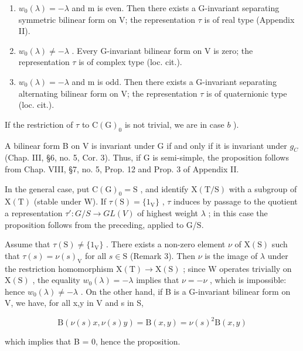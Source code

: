 \begin{enumerate}
\def\labelenumi{\alph{enumi})}
\item
  \(w_{0}(\lambda) = -\lambda\) and m is even. Then there exists a G-invariant separating symmetric bilinear form on V; the representation \(\tau\) is of real type (Appendix II).
\item
  \(w_{0}(\lambda) \neq -\lambda\) . Every G-invariant bilinear form on V is zero; the representation \(\tau\) is of complex type (loc. cit.).
\item
  \(w_{0}(\lambda) = -\lambda\) and m is odd. Then there exists a G-invariant separating alternating bilinear form on V; the representation \(\tau\) is of quaternionic type (loc. cit.).
\end{enumerate}

If the restriction of \(\tau\) to \(\mathrm{C}(\mathrm{G})_0\) is not trivial, we are in case \(b\) ).

A bilinear form B on V is invariant under G if and only if it is invariant under \(g_{C}\) (Chap. III, §6, no. 5, Cor. 3). Thus, if G is semi-simple, the proposition follows from Chap. VIII, §7, no. 5, Prop. 12 and Prop. 3 of Appendix II.

In the general case, put \(\mathrm{C}(\mathrm{G})_{0} = \mathrm{S}\) , and identify \(\mathrm{X}(\mathrm{T}/\mathrm{S})\) with a subgroup of \(\mathrm{X}(\mathrm{T})\) (stable under W). If \(\tau(\mathrm{S}) = \{1_{\mathrm{V}}\}\) , \(\tau\) induces by passage to the quotient a representation \(\tau' : G/S \to GL(V)\) of highest weight \(\lambda\) ; in this case the proposition follows from the preceding, applied to G/S.

Assume that \(\tau (\mathrm{S})\neq \{1_{\mathrm{V}}\}\) . There exists a non-zero element \(\nu\) of \(\mathrm{X(S)}\) such that \(\tau (s) = \nu (s)_{\mathrm{V}}\) for all \(s\in \mathrm{S}\) (Remark 3). Then \(\nu\) is the image of \(\lambda\) under the restriction homomorphism \(\mathrm{X}(\mathrm{T})\to\mathrm{X}(\mathrm{S})\) ; since W operates trivially on \(\mathrm{X}(\mathrm{S})\) , the equality \(w_{0}(\lambda)=-\lambda\) implies that \(\nu=-\nu\) , which is impossible: hence \(w_{0}(\lambda)\neq-\lambda\) . On the other hand, if B is a G-invariant bilinear form on V, we have, for all x,y in V and s in S,

\[
\mathrm{B} (\nu (s) x, \nu (s) y) = \mathrm{B} (x, y) = \nu (s) ^ {2} \mathrm{B} (x, y)
\]

which implies that B = 0, hence the proposition.

